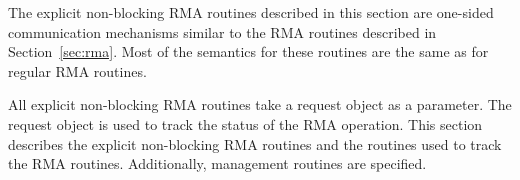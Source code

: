 The explicit non-blocking \ac{RMA} routines described in this section are
one-sided communication mechanisms similar to the \ac{RMA} routines
described in Section~\ref{sec:rma}. Most of the semantics for these
routines are the same as for regular \ac{RMA} routines.

All explicit non-blocking \ac{RMA} routines take a request object as a
parameter. The request object is used to track the status of the \ac{RMA}
operation. This section describes the explicit non-blocking \ac{RMA}
routines and the routines used to track the \ac{RMA} routines.
Additionally, management routines are specified.

